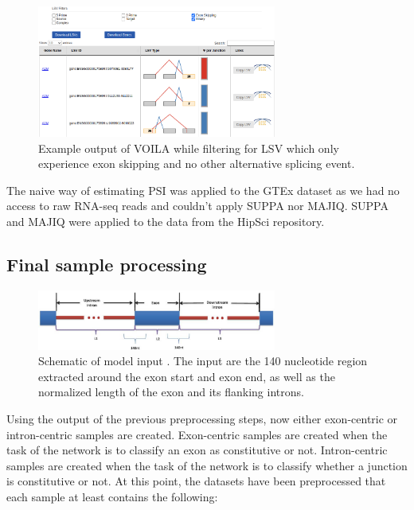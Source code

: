 \begin{figure}
	\centering\includegraphics[width=0.7\textwidth]{../visualizations/ch4-methods/voila_example.png} 
	\caption[Four-chamber illustration of the human heart.]{Example output of VOILA while filtering for LSV which only experience exon skipping and no other alternative splicing event. }
	\label{fig:voilaexample}
\end{figure}



The naive way of estimating PSI was applied to the GTEx dataset as we had no access to raw RNA-seq reads and couldn't apply SUPPA nor MAJIQ. SUPPA and MAJIQ were applied to the data from the HipSci repository.
\subsection{Final sample processing} \label{subsec:finalsampleprocessing}

\begin{figure}
	\centering\includegraphics[width=0.7\textwidth]{../visualizations/ch4-methods/input_schematic.png} 
	\caption[bla.]{Schematic of model input \cite{dsc}. The input are the 140 nucleotide region extracted around the exon start and exon end, as well as the normalized length of the exon and its flanking introns. }
	\label{fig:inputschematic}
\end{figure}

Using the output of the previous preprocessing steps, now either exon-centric or intron-centric samples are created. Exon-centric samples are created when the task of the network is to classify an exon as constitutive or not. Intron-centric samples are created when the task of the network is to classify whether a junction is constitutive or not.
At this point, the datasets have been preprocessed that each sample at least contains the following:

